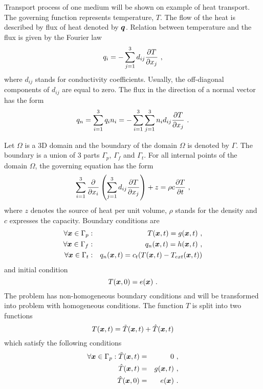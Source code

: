 Transport process of one medium will be shown on example of heat transport. The governing function represents
temperature, $T$. The flow of the heat is described by flux of heat denoted by $\mbox{\boldmath$q$}$. Relation between
temperature and the flux is given by the Fourier law
\begin{equation}
q_i = - \sum_{j=1}^{3} d_{ij} \mbox{$\displaystyle\frac{\partial{T}}{\partial{x_j}}$}\ ,
\end{equation}
where $d_{ij}$ stands for conductivity coefficients. Usually, the off-diagonal components of $d_{ij}$ are equal
to zero. The flux in the direction of a normal vector has the form
\begin{equation}
q_n = \sum_{i=1}^{3} q_i n_i = - \sum_{i=1}^{3} \sum_{j=1}^{3} n_i d_{ij} \mbox{$\displaystyle\frac{\partial{T}}{\partial{x_j}}$}\ .
\end{equation}

Let $\Omega$ is a 3D domain
and the boundary of the domain $\Omega$ is denoted by $\Gamma$. The boundary is a union of 3 parts
$\Gamma_p$, $\Gamma_f$ and $\Gamma_t$. For all internal points of the domain $\Omega$, the governing
equation has the form
\begin{equation}\label{eqgoveqn}
\sum_{i=1}^{3} \mbox{$\displaystyle\frac{\partial{}}{\partial{x_i}}$} \left(\sum_{j=1}^{3} d_{ij} \mbox{$\displaystyle\frac{\partial{T}}{\partial{x_{j}}}$}\right) + z = \rho c \mbox{$\displaystyle\frac{\partial{T}}{\partial{t}}$}\ ,
\end{equation}
where $z$ denotes the source of heat per unit volume, $\rho$ stands for the density and $c$ expresses the capacity.
Boundary conditions are
\begin{eqnarray}
\forall \mbf{x} \in \Gamma_p &:& T(\mbf{x},t) = g(\mbf{x},t)\ ,
\\
\forall \mbf{x} \in \Gamma_f &:& q_n(\mbf{x},t) = h(\mbf{x},t)\ ,
\\
\forall \mbf{x} \in \Gamma_t &:& q_n(\mbf{x},t) = c_t (T(\mbf{x},t) - T_{ext}(\mbf{x},t))
\end{eqnarray}
and initial condition
\begin{equation}
T(\mbox{\boldmath$x$},0) = e(\mbox{\boldmath$x$})\ .
\end{equation}
The problem has non-homogeneous boundary conditions and will be transformed into problem with homogeneous
conditions. The function $T$ is split into two functions
\begin{equation}\label{eqhomboundcond}
T(\mbox{\boldmath$x$},t) = \tilde{T}(\mbox{\boldmath$x$},t) + \hat{T}(\mbox{\boldmath$x$},t)
\end{equation}
which satisfy the following conditions
\begin{eqnarray}
\forall \mbox{\boldmath$x$} \in \Gamma_p : \tilde{T}(\mbox{\boldmath$x$},t) &=& 0\ ,
\\
\hat{T}(\mbox{\boldmath$x$},t) &=& g(\mbox{\boldmath$x$},t)\ ,
\\
\hat{T}(\mbox{\boldmath$x$},0) &=& e(\mbox{\boldmath$x$})\ .
\end{eqnarray}
